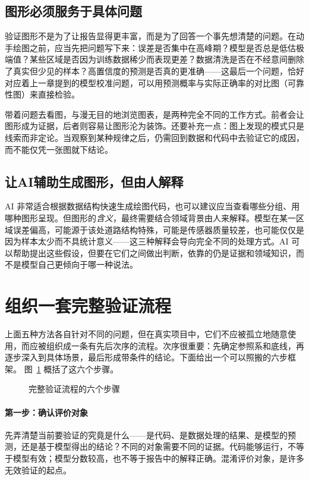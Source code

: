 \subsection{图形必须服务于具体问题}

验证图形不是为了让报告显得更丰富，而是为了回答一个事先想清楚的问题。在动手绘图之前，应当先把问题写下来：误差是否集中在高峰期？模型是否总是低估极端值？某些区域是否因为训练数据稀少而表现更差？数据清洗是否在不经意间删除了真实但少见的样本？高置信度的预测是否真的更准确——这最后一个问题，恰好对应着上一章提到的模型校准问题\cite{guo2017calibration}，可以用预测概率与实际正确率的对比图（可靠性图）来直接检验。

带着问题去看图，与漫无目的地浏览图表，是两种完全不同的工作方式。前者会让图形成为证据，后者则容易让图形沦为装饰。还要补充一点：图上发现的模式只是线索而非定论。当观察到某种规律之后，仍需回到数据和代码中去验证它的成因，而不能仅凭一张图就下结论。

\subsection{让AI辅助生成图形，但由人解释}

AI 非常适合根据数据结构快速生成绘图代码，也可以建议应当查看哪些分组、用哪种图形呈现。但图形的\emph{含义}，最终需要结合领域背景由人来解释。模型在某一区域误差偏高，可能源于该处道路结构特殊，可能是传感器质量较差，也可能仅仅是因为样本太少而不具统计意义——这三种解释会导向完全不同的处理方式。AI 可以帮助提出这些假设，但要在它们之间做出判断，依靠的仍是证据和领域知识，而不是模型自己更倾向于哪一种说法。

\section{组织一套完整验证流程}

上面五种方法各自针对不同的问题，但在真实项目中，它们不应被孤立地随意使用，而应被组织成一条有先后次序的流程。次序很重要：先确定参照系和底线，再逐步深入到具体场景，最后形成带条件的结论。下面给出一个可以照搬的六步框架。
图~\ref{fig:ch13_flow} 概括了这六个步骤。

\begin{figure}[H]
  \centering
  \caption{完整验证流程的六个步骤}
  \label{fig:ch13_flow}
\end{figure}

\paragraph{第一步：确认评价对象}
先弄清楚当前要验证的究竟是什么——是代码、是数据处理的结果、是模型的预测，还是基于模型得出的结论？不同的对象需要不同的证据。代码能够运行，不等于模型有效；模型分数较高，也不等于报告中的解释正确。混淆评价对象，是许多无效验证的起点。

